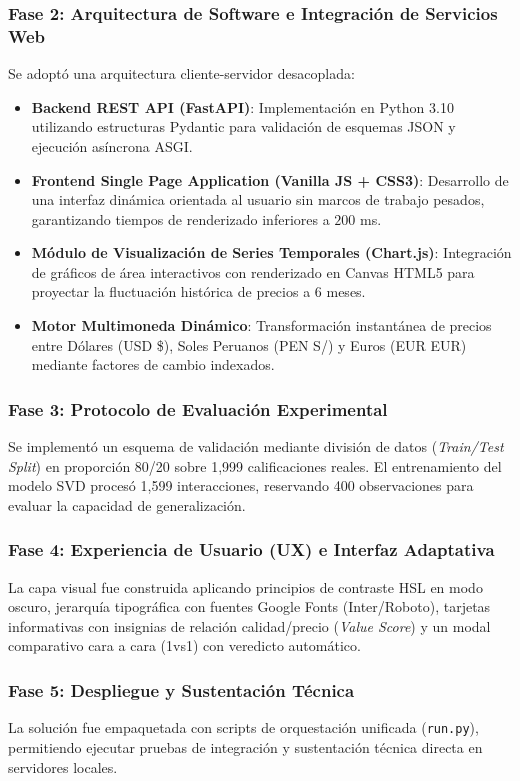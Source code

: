 \documentclass[12pt,a4paper]{article}
\begin{document}
\subsubsection{Fase 2: Arquitectura de Software e Integración de Servicios Web}
Se adoptó una arquitectura cliente-servidor desacoplada:
\begin{itemize}
    \item \textbf{Backend REST API (FastAPI)}: Implementación en Python 3.10 utilizando estructuras Pydantic para validación de esquemas JSON y ejecución asíncrona ASGI.
    \item \textbf{Frontend Single Page Application (Vanilla JS + CSS3)}: Desarrollo de una interfaz dinámica orientada al usuario sin marcos de trabajo pesados, garantizando tiempos de renderizado inferiores a $200$ ms.
    \item \textbf{Módulo de Visualización de Series Temporales (Chart.js)}: Integración de gráficos de área interactivos con renderizado en Canvas HTML5 para proyectar la fluctuación histórica de precios a 6 meses.
    \item \textbf{Motor Multimoneda Dinámico}: Transformación instantánea de precios entre Dólares (USD \$), Soles Peruanos (PEN S/) y Euros (EUR EUR) mediante factores de cambio indexados.
\end{itemize}

\subsubsection{Fase 3: Protocolo de Evaluación Experimental}
Se implementó un esquema de validación mediante división de datos (\textit{Train/Test Split}) en proporción 80/20 sobre 1,999 calificaciones reales. El entrenamiento del modelo SVD procesó 1,599 interacciones, reservando 400 observaciones para evaluar la capacidad de generalización.

\subsubsection{Fase 4: Experiencia de Usuario (UX) e Interfaz Adaptativa}
La capa visual fue construida aplicando principios de contraste HSL en modo oscuro, jerarquía tipográfica con fuentes Google Fonts (Inter/Roboto), tarjetas informativas con insignias de relación calidad/precio (\textit{Value Score}) y un modal comparativo cara a cara (1vs1) con veredicto automático.

\subsubsection{Fase 5: Despliegue y Sustentación Técnica}
La solución fue empaquetada con scripts de orquestación unificada (\texttt{run.py}), permitiendo ejecutar pruebas de integración y sustentación técnica directa en servidores locales.
\end{document}
